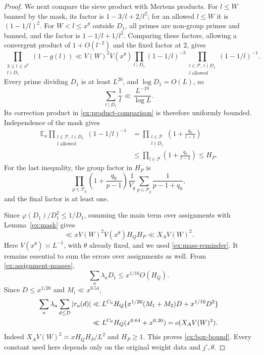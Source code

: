 \begin{proof}
We next compare the sieve product with Mertens products. For
$l\le W$ banned by the mask, its factor is
$1-3/l+2/l^2$; for an allowed $l\le W$ it is $(1-1/l)^2$.
For $W<l\le x^\theta$ outside $D_1$, all primes are non-group
primes and banned, and the factor is $1-1/l+1/l^2$.
Comparing these factors, allowing a convergent product of
$1+O(l^{-2})$ and the fixed factor at $2$, gives
\begin{equation}\label{ex:product-comparison}
 \prod_{\substack{3\le l\le x^\theta\\l\nmid D_1}}(1-g(l))
 \ll V(W)^2V(x^\theta)
       \prod_{l\mid D_1}(1-1/l)^{-3}
       \prod_{\substack{l\in\mathcal P,\ l\nmid D_1\\
                         l\text{ allowed}}}(1-1/l)^{-1}.
\end{equation}
Every prime dividing $D_1$ is at least $L^{20}$, and
$\log D_1=O(L)$, so
\[
 \sum_{l\mid D_1}\frac1l
       \ll\frac{L^{-19}}{\log L}.
\]
Its correction product in \eqref{ex:product-comparison} is
therefore uniformly bounded. Independence of the mask gives
\begin{align*}
 \mathbb E_a
 \prod_{\substack{l\in\mathcal P,\ l\nmid D_1\\l\text{ allowed}}}
              (1-1/l)^{-1}
 &=\prod_{\substack{l\in\mathcal P\\l\nmid D_1}}
              \left(1+\frac{q_0}{l-1}\right)\\
 &\le\prod_{l\in\mathcal P}\left(1+\frac{q_0}{l-1}\right)
 \le H_P.
\end{align*}
For the last inequality, the group factor in $H_P$ is
\[
 \prod_{p\in\mathcal P_g}\left(1+\frac{q_0}{p-1}\right)
       \frac1{V_g}\sum_{p\in\mathcal P_g}\frac1{p-1+q_0},
\]
and the final factor is at least one.

Since $\varphi(D_1)/D_1^2\le1/D_1$, summing the main term over
assignments with Lemma~\ref{ex:mask} gives
\begin{equation}\label{ex:box-main}
 \ll xV(W)^2V(x^\theta)H_QH_P
 \ll X_AV(W)^2.
\end{equation}
Here $V(x^\theta)\asymp L^{-1}$, with $\theta$ already fixed,
and we used \eqref{ex:mass-reminder}.
It remains essential to sum the errors over assignments as well.
From \eqref{ex:assignment-masses},
\[
 \sum_a\lambda_aD_1\le x^{1/10}O(H_Q).
\]
Since $D\le x^{1/20}$ and $M_i\ll x^{0.54}$,
\begin{align}
 \sum_a\lambda_a\sum_{d\le D}|r_a(d)|
 &\ll L^{C_0}H_Q
       \{x^{1/20}(M_1+M_2)D+x^{1/10}D^2\}\notag\\
 &\ll L^{C_0}H_Q(x^{0.64}+x^{0.20})
   =o(X_AV(W)^2).\label{ex:all-box-errors}
\end{align}
Indeed $X_AV(W)^2\asymp xH_QH_P/L^2$ and $H_P\ge1$.
This proves \eqref{ex:box-bound}. Every constant used here depends
only on the original weight data and $j',\theta$.
\end{proof}

